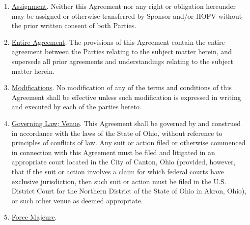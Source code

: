 \documentclass{article}
\begin{document}
\begin{enumerate}
  \begin{enumerate}
  \def\labelenumii{\arabic{enumii}.}
  \item
    \uline{Assignment}. Neither this Agreement nor any right or
    obligation hereunder may be assigned or otherwise transferred by
    Sponsor and/or HOFV without the prior written consent of both
    Parties.
  \item
    \uline{Entire Agreement}. The provisions of this Agreement contain
    the entire agreement between the Parties relating to the subject
    matter herein, and supersede all prior agreements and understandings
    relating to the subject matter herein.
  \item
    \uline{Modifications}. No modification of any of the terms and
    conditions of this Agreement shall be effective unless such
    modification is expressed in writing and executed by each of the
    parties hereto.
  \item
    \uline{Governing Law; Venue}. This Agreement shall be governed by
    and construed in accordance with the laws of the State of Ohio,
    without reference to principles of conflicts of law. Any suit or
    action filed or otherwise commenced in connection with this
    Agreement must be filed and litigated in an appropriate court
    located in the City of Canton, Ohio (provided, however, that if the
    suit or action involves a claim for which federal courts have
    exclusive jurisdiction, then such suit or action must be filed in
    the U.S. District Court for the Northern District of the State of
    Ohio in Akron, Ohio), or such other venue as deemed appropriate.
  \item
    \uline{Force Majeure}.


\end{enumerate}
\end{enumerate}
\end{document}

